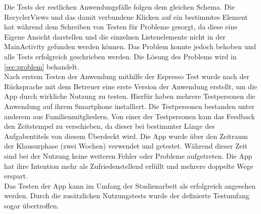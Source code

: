 Die Tests der restlichen Anwendungsfälle folgen dem gleichen Schema. Die RecyclerViews und das damit verbundene Klicken auf ein bestimmtes Element hat während dem Schreiben von Testen für Probleme gesorgt, da diese eine Eigene Ansicht darstellen und die einzelnen Listenelemente nicht in der MainActivity gefunden werden können. Das Problem konnte jedoch behoben und alle Tests erfolgreich geschrieben werden. Die Lösung des Problems wird in \autoref{sec:problem} behandelt.\\
Nach erstem Testen der Anwendung mithilfe der Espresso Test wurde nach der Rücksprache mit dem Betreuer eine erste Version der Anwendung erstellt, um die App durch wirkliche Nutzung zu testen. Hierfür haben mehrere Testpersonen die Anwendung auf ihrem Smartphone installiert. Die Testpersonen bestanden unter anderem aus Familienmitgliedern. Von einer der Testpersonen kam das Feedback den Zeitstempel zu verschieben, da dieser bei bestimmter Länge des Aufgabentitels von diesem Überdeckt wird. Die App wurde über den Zeitraum der Klausurphase (zwei Wochen) verwendet und getestet. Während dieser Zeit sind bei der Nutzung keine weiteren Fehler oder Probleme aufgetreten. Die App hat ihre Intention mehr als Zufriedenstellend erfüllt und mehrere doppelte Wege erspart.\\
Das Testen der App kann im Umfang der Studienarbeit als erfolgreich angesehen werden. Durch die zusätzlichen Nutzungstests wurde der definierte Testumfang sogar übertroffen.

